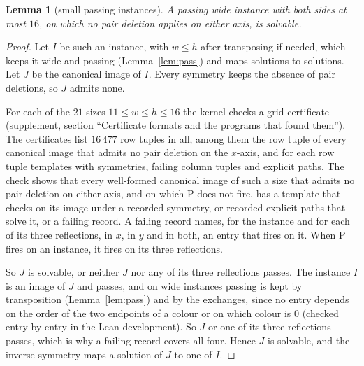 \documentclass[11pt]{article}
\newtheorem{lemma}[theorem]{Lemma}
\newcommand{\ent}[1]{\textsf{#1}}
\begin{document}
\begin{lemma}[small passing instances]\label{lem:small}\label{lem:boxes}
A passing wide instance with both sides at most $16$, on which no pair deletion applies on either
axis, is solvable.
\end{lemma}
\begin{proof}
Let $I$ be such an instance, with $w\le h$ after transposing if needed, which keeps it wide and
passing (Lemma~\ref{lem:pass}) and maps solutions to solutions. Let $J$ be the canonical image of
$I$. Every symmetry keeps the absence of pair deletions, so $J$ admits none.

For each of the $21$ sizes $11\le w\le h\le 16$ the kernel checks a grid certificate (supplement,
section ``Certificate formats and the programs that found them''). The certificates list
$16\,477$ row tuples in all, among them the row tuple of every canonical image that admits no pair
deletion on the $x$-axis, and for each row tuple templates with symmetries, failing column tuples
and explicit paths. The check shows that every well-formed canonical image of such a size that
admits no pair deletion on either axis, and on which \ent{P} does not fire, has a template that
checks on its image under a recorded symmetry, or recorded explicit paths that solve it, or a
failing record. A failing record names, for the instance and for each of its three reflections, in
$x$, in $y$ and in both, an entry that fires on it. When \ent{P} fires on an instance, it fires on
its three reflections.

So $J$ is solvable, or neither $J$ nor any of its three reflections passes. The instance $I$ is an
image of $J$ and passes, and on wide instances passing is kept by
transposition (Lemma~\ref{lem:pass}) and by the exchanges, since no entry depends on the order of
the two endpoints of a colour or on which colour is $0$ (checked entry by entry in the Lean
development). So $J$ or one of its three reflections passes, which is why a failing record covers
all four. Hence $J$ is solvable, and the inverse symmetry maps a solution of $J$ to one of $I$.
\end{proof}
\end{document}
